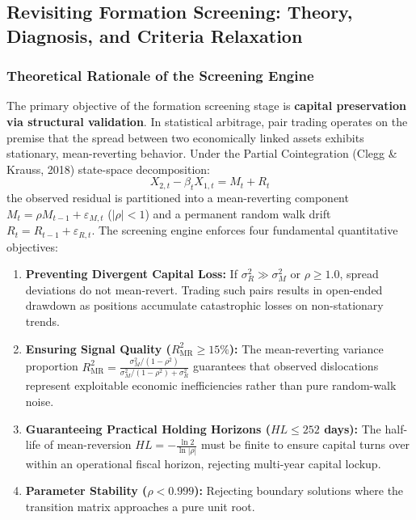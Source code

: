 \documentclass[11pt, a4paper]{article}
\begin{document}
\subsection{Revisiting Formation Screening: Theory, Diagnosis, and Criteria Relaxation}
\label{sec:screening_review}

\subsubsection{Theoretical Rationale of the Screening Engine}
The primary objective of the formation screening stage is \textbf{capital preservation via structural validation}. In statistical arbitrage, pair trading operates on the premise that the spread between two economically linked assets exhibits stationary, mean-reverting behavior. Under the Partial Cointegration (Clegg \& Krauss, 2018) state-space decomposition:
\begin{equation}
    X_{2,t} - \beta_t X_{1,t} = M_t + R_t
\end{equation}
the observed residual is partitioned into a mean-reverting component $M_t = \rho M_{t-1} + \varepsilon_{M,t}$ ($|\rho| < 1$) and a permanent random walk drift $R_t = R_{t-1} + \varepsilon_{R,t}$. The screening engine enforces four fundamental quantitative objectives:
\begin{enumerate}
    \item \textbf{Preventing Divergent Capital Loss:} If $\sigma_R^2 \gg \sigma_M^2$ or $\rho \ge 1.0$, spread deviations do not mean-revert. Trading such pairs results in open-ended drawdown as positions accumulate catastrophic losses on non-stationary trends.
    \item \textbf{Ensuring Signal Quality ($R^2_{\text{MR}} \ge 15\%$):} The mean-reverting variance proportion $R^2_{\text{MR}} = \frac{\sigma_M^2 / (1-\rho^2)}{\sigma_M^2 / (1-\rho^2) + \sigma_R^2}$ guarantees that observed dislocations represent exploitable economic inefficiencies rather than pure random-walk noise.
    \item \textbf{Guaranteeing Practical Holding Horizons ($HL \le 252$ days):} The half-life of mean-reversion $HL = -\frac{\ln 2}{\ln |\rho|}$ must be finite to ensure capital turns over within an operational fiscal horizon, rejecting multi-year capital lockup.
    \item \textbf{Parameter Stability ($\rho < 0.999$):} Rejecting boundary solutions where the transition matrix approaches a pure unit root.
\end{enumerate}
\end{document}
